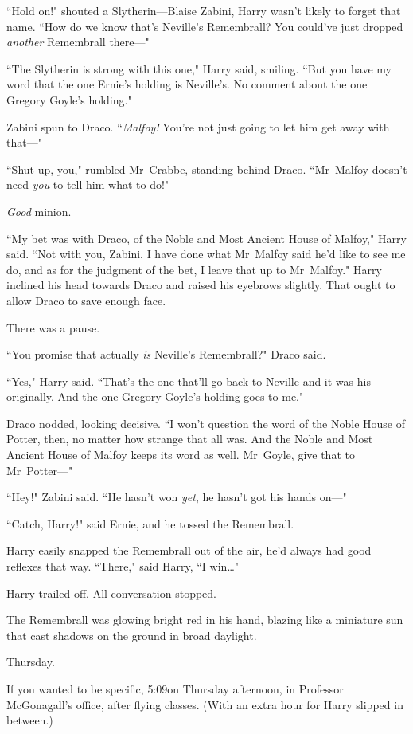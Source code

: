 ``Hold on!" shouted a Slytherin—Blaise Zabini, Harry wasn't likely to forget that name. ``How do we know that's Neville's Remembrall? You could've just dropped \emph{another} Remembrall there—"

``The Slytherin is strong with this one," Harry said, smiling. ``But you have my word that the one Ernie's holding is Neville's. No comment about the one Gregory Goyle's holding."

Zabini spun to Draco. ``\emph{Malfoy!} You're not just going to let him get away with that—"

``Shut up, you," rumbled Mr~Crabbe, standing behind Draco. ``Mr~Malfoy doesn't need \emph{you} to tell him what to do!"

\emph{Good} minion.

``My bet was with Draco, of the Noble and Most Ancient House of Malfoy," Harry said. ``Not with you, Zabini. I have done what Mr~Malfoy said he'd like to see me do, and as for the judgment of the bet, I leave that up to Mr~Malfoy." Harry inclined his head towards Draco and raised his eyebrows slightly. That ought to allow Draco to save enough face.

There was a pause.

``You promise that actually \emph{is} Neville's Remembrall?" Draco said.

``Yes," Harry said. ``That's the one that'll go back to Neville and it was his originally. And the one Gregory Goyle's holding goes to me."

Draco nodded, looking decisive. ``I won't question the word of the Noble House of Potter, then, no matter how strange that all was. And the Noble and Most Ancient House of Malfoy keeps its word as well. Mr~Goyle, give that to Mr~Potter—"

``Hey!" Zabini said. ``He hasn't won \emph{yet}, he hasn't got his hands on—"

``Catch, Harry!" said Ernie, and he tossed the Remembrall.

Harry easily snapped the Remembrall out of the air, he'd always had good reflexes that way. ``There," said Harry, ``I win{\ldots}"

Harry trailed off. All conversation stopped.

The Remembrall was glowing bright red in his hand, blazing like a miniature sun that cast shadows on the ground in broad daylight.

\later

Thursday.

If you wanted to be specific, 5:09\pm on Thursday afternoon, in Professor McGonagall's office, after flying classes. (With an extra hour for Harry slipped in between.)

